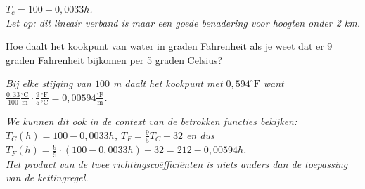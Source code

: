 \begin{werktekstoef}
\emph{$T_c=100-0,0033h$.\\ Let op: dit lineair verband is maar een goede benadering voor hoogten onder 2 km.}

\item{Hoe daalt het kookpunt van water in graden Fahrenheit als je weet dat er 9 graden Fahrenheit bijkomen per 5 graden Celsius?}

\emph{Bij elke stijging van $100$ m daalt het kookpunt met $0,594^\circ \mathrm{F}$ want $\displaystyle \frac{0,33}{100}\frac{^\circ \mathrm{C}}{\mathrm{m}}\cdot \frac{9}{5}\frac{^\circ \mathrm{F}}{^\circ \mathrm{C}}=0,00594\frac{^\circ \mathrm{F}}{\mathrm{m}}$.}

\emph{We kunnen dit ook in de context van de betrokken functies bekijken:\\ $T_C(h)=100-0,0033h$, $T_F=\frac{9}{5}T_C+32$ en dus $T_F(h)=\frac{9}{5}\cdot (100-0,0033h)+32=212-0,00594h$. \\Het product van de twee richtingscoëfficiënten is niets anders dan de toepassing van de kettingregel.}







\end{werktekstoef}  

\eindewerktekst

